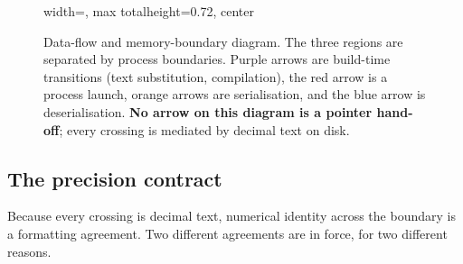 \documentclass[11pt,a4paper]{article}
\begin{document}
\begin{figure}[H]
\begin{adjustbox}{width=\linewidth, max totalheight=0.72\textheight, center}
\end{adjustbox}
\caption{Data-flow and memory-boundary diagram. The three regions are separated
by process boundaries. Purple arrows are build-time transitions (text
substitution, compilation), the red arrow is a process launch, orange arrows
are serialisation, and the blue arrow is deserialisation. \textbf{No arrow on
this diagram is a pointer hand-off}; every crossing is mediated by decimal
text on disk.}
\label{fig:mem}
\end{figure}


\subsection{The precision contract}\label{sec:precision}

Because every crossing is decimal text, numerical identity across the boundary
is a formatting agreement. Two different agreements are in force, for two
different reasons.
\end{document}
